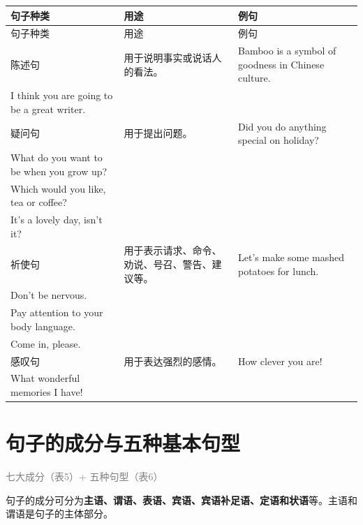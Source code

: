 \documentclass[11pt,a4paper]{ctexart}
\begin{document}
{\footnotesize
\begin{longtable}{p{4.47cm}p{4.47cm}p{4.47cm}}
\hline
句子种类 & 用途 & 例句 \\
\hline
\endfirsthead
\hline
句子种类 & 用途 & 例句 \\
\hline
\endhead
\hline
\endfoot
陈述句 & 用于说明事实或说话人的看法。 & Bamboo is a symbol of goodness in Chinese culture.\\ I think you are going to be a great writer. \\
疑问句 & 用于提出问题。 & Did you do anything special on holiday?\\ What do you want to be when you grow up?\\ Which would you like, tea or coffee?\\ It’s a lovely day, isn’t it? \\
祈使句 & 用于表示请求、命令、劝说、号召、警告、建议等。 & Let’s make some mashed potatoes for lunch.\\ Don’t be nervous.\\ Pay attention to your body language.\\ Come in, please. \\
感叹句 & 用于表达强烈的感情。 & How clever you are!\\ What wonderful memories I have! \\
\end{longtable}
}

\begin{center}\end{center}

\section{句子的成分与五种基本句型}
\noindent\textcolor{gray}{七大成分（表5）+ 五种句型（表6）}\par\smallskip
句子的成分可分为\textbf{主语、谓语、表语、宾语、宾语补足语、定语和状语}等。主语和谓语是句子的主体部分。
\end{document}
